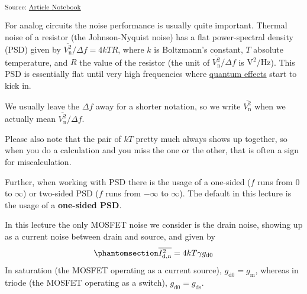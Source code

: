 \documentclass[
  a4paper,
  DIV=11,
  numbers=noendperiod]{scrartcl}
\begin{document}
\textsubscript{Source:
\href{https://iic-jku.github.io/analog-circuit-design/index.qmd.html}{Article
Notebook}}

For analog circuits the noise performance is usually quite important.
Thermal noise of a resistor (the Johnson-Nyquist noise) has a flat
power-spectral density (PSD) given by
\(\overline{V_\mathrm{n}^2}/\Delta f = 4 k T R\), where \(k\) is
Boltzmann's constant, \(T\) absolute temperature, and \(R\) the value of
the resistor (the unit of \(\overline{V_\mathrm{n}^2}/\Delta f\) is
\(\text{V}^2/\text{Hz}\)). This PSD is essentially flat until very high
frequencies where
\href{https://en.wikipedia.org/wiki/Johnson–Nyquist_noise}{quantum
effects} start to kick in.

\begin{tcolorbox}[enhanced jigsaw, opacitybacktitle=0.6, colback=white, left=2mm, toptitle=1mm, opacityback=0, rightrule=.15mm, bottomrule=.15mm, breakable, arc=.35mm, toprule=.15mm, colframe=quarto-callout-note-color-frame, colbacktitle=quarto-callout-note-color!10!white, bottomtitle=1mm, titlerule=0mm, coltitle=black, leftrule=.75mm, title=\textcolor{quarto-callout-note-color}{\faInfo}\hspace{0.5em}{Note}]

We usually leave the \(\Delta f\) away for a shorter notation, so we
write \(\overline{V_\mathrm{n}^2}\) when we actually mean
\(\overline{V_\mathrm{n}^2}/\Delta f\).

Please also note that the pair of \(k T\) pretty much always shows up
together, so when you do a calculation and you miss the one or the
other, that is often a sign for miscalculation.

Further, when working with PSD there is the usage of a one-sided (\(f\)
runs from \(0\) to \(\infty\)) or two-sided PSD (\(f\) runs from
\(-\infty\) to \(\infty\)). The default in this lecture is the usage of
a \textbf{one-sided PSD}.

\end{tcolorbox}

In this lecture the only MOSFET noise we consider is the drain noise,
showing up as a current noise between drain and source, and given by
\begin{equation}\phantomsection\label{eq-mosfet-noise}{
\overline{I_\mathrm{d,n}^2} = 4 k T \gamma g_\mathrm{d0}
}\end{equation} In saturation (the MOSFET operating as a current
source), \(g_\mathrm{d0} = g_\mathrm{m}\), whereas in triode (the MOSFET
operating as a switch), \(g_\mathrm{d0} = g_\mathrm{ds}\).
\end{document}
